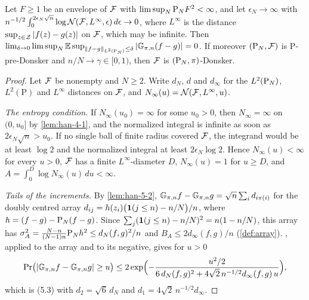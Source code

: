 \begin{corollary}
  \label{cor:han-5-7}
  Let $F\ge1$ be an envelope of $\mathcal{F}$ with $\limsup_N\mathrm{P}_N F^2<\infty$, and let $\epsilon_N\to\infty$ with $n^{-1/2}\int_0^{2\epsilon_N\sqrt n}\log\mathcal{N}(\mathcal{F},L^\infty,\epsilon)\,d\epsilon\to0$, where $L^\infty$ is the distance $\sup_{z\in\mathcal{Z}}|f(z)-g(z)|$ on $\mathcal{F}$, which may be infinite. Then $\lim_{\delta\to0}\limsup_N\mathbb{E}\sup_{\|f-g\|_{L^2(\mathrm{P}_N)}\le\delta}|\mathbb{G}_{\pi,n}(f-g)|=0$. If moreover $(\mathrm{P}_N,\mathcal{F})$ is $\mathrm P$-pre-Donsker and $n/N\to\gamma\in[0,1)$, then $\mathcal{F}$ is $(\mathrm{P}_N,\pi)$-Donsker.
\end{corollary}
\begin{proof}
  Let $\mathcal{F}$ be nonempty and $N\ge2$. Write $d_N$, $d$ and $d_\infty$ for the $L^2(\mathrm{P}_N)$, $L^2(\mathrm P)$ and $L^\infty$ distances on $\mathcal{F}$, and $N_\infty(u)=\mathcal{N}(\mathcal{F},L^\infty,u)$.

  \emph{The entropy condition.} If $N_\infty(u_0)=\infty$ for some $u_0>0$, then $N_\infty=\infty$ on $(0,u_0]$ by \cref{lem:han-4-1}, and the normalized integral is infinite as soon as $2\epsilon_N\sqrt n>u_0$. If no single ball of finite radius covered $\mathcal{F}$, the integrand would be at least $\log2$ and the normalized integral at least $2\epsilon_N\log2$. Hence $N_\infty(u)<\infty$ for every $u>0$, $\mathcal{F}$ has a finite $L^\infty$-diameter $D$, $N_\infty(u)=1$ for $u\ge D$, and $A=\int_0^D\log N_\infty(u)\,du<\infty$.

  \emph{Tails of the increments.} By \cref{lem:han-5-2}, $\mathbb{G}_{\pi,n} f-\mathbb{G}_{\pi,n} g=\sqrt n\sum_id_{i\pi(i)}$ for the doubly centred array $d_{ij}=h(z_i)\bigl(\mathbf{1}(j\le n)-n/N\bigr)/n$, where $h=(f-g)-\mathrm{P}_N(f-g)$. Since $\sum_j(\mathbf{1}(j\le n)-n/N)^2=n(1-n/N)$, this array has $\sigma_A^2=\frac{N-n}{(N-1)n}\mathrm{P}_N h^2\le d_N(f,g)^2/n$ and $B_A\le2d_\infty(f,g)/n$ (\cref{def:array}). , applied to the array and to its negative, gives for $u>0$
  \[
    \Pr\bigl(|\mathbb{G}_{\pi,n} f-\mathbb{G}_{\pi,n} g|\ge u\bigr)\le2\exp\Bigl(-\frac{u^2/2}{6\,d_N(f,g)^2+4\sqrt2\,n^{-1/2}d_\infty(f,g)\,u}\Bigr),
  \]
  which is (5.3) with $d_2=\sqrt6\,d_N$ and $d_1=4\sqrt2\,n^{-1/2}d_\infty$.


\end{proof}

